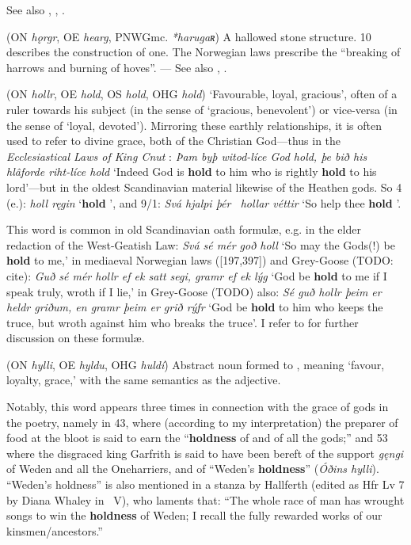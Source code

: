 \begin{itemize}
  See also , , .

 (ON \emph{hǫrgr}, OE \emph{hearg}, PNWGmc. \emph{*harugaʀ})
  A hallowed stone structure.   10 describes the construction of one.  The Norwegian laws prescribe the “breaking of harrows and burning of hoves”.
  --- See also , .

 (ON \emph{hollr}, OE \emph{hold}, OS \emph{hold}, OHG \emph{hold})
  ‘Favourable, loyal, gracious’, often of a ruler towards his subject (in the sense of ‘gracious, benevolent’) or vice-versa (in the sense of ‘loyal, devoted’).  Mirroring these earthly relationships, it is often used to refer to divine grace, both of the Christian God---thus in the \emph{Ecclesiastical Laws of King Cnut} : \emph{Þam byþ witod-líce God hold, þe bið his hlâforde riht-líce hold} ‘Indeed God is \textbf{hold} to him who is rightly \textbf{hold} to his lord’---but in the oldest Scandinavian material likewise of the Heathen gods.
  So  4 (e.): \emph{holl ręgin} ‘\textbf{hold} ’, and  9/1: \emph{Svá hjalpi þér \hld\ hollar véttir} ‘So help thee \textbf{hold} ’. %

  This word is common in old Scandinavian oath formulæ, e.g. in the elder redaction of the West-Geatish Law: \emph{Svá sé mér goð holl} ‘So may the Gods(!) be \textbf{hold} to me,’ in mediaeval Norwegian laws ([197,397]) and Grey-Goose (TODO: cite): \emph{Guð sé mér hollr ef ek satt segi, gramr ef ek lýg} ‘God be \textbf{hold} to me if I speak truly, wroth if I lie,’ in Grey-Goose (TODO) also: \emph{Sé guð hollr þeim er heldr griðum, en gramr þeim er grið rýfr} ‘God be \textbf{hold} to him who keeps the truce, but wroth against him who breaks the truce’. I refer to \textcite{Läffler1895} for further discussion on these formulæ.

 (ON \emph{hylli}, OE \emph{hyldu}, OHG \emph{huldí})
  Abstract noun formed to , meaning ‘favour, loyalty, grace,’ with the same semantics as the adjective.

  Notably, this word appears three times in connection with the grace of gods in the poetry, namely in  43, where (according to my interpretation) the preparer of food at the bloot is said to earn the “\textbf{holdness} of  and of all the gods;” and  53 where the disgraced king Garfrith is said to have been bereft of the support \emph{gęngi} of Weden and all the Oneharriers, and of “Weden’s \textbf{holdness}” (\emph{Óðins hylli}).  “Weden’s holdness” is also mentioned in a stanza by Hallferth (edited as Hfr Lv 7 by Diana Whaley in \Skp\ V), who laments that: “The whole race of man has wrought songs to win the \textbf{holdness} of Weden; I recall the fully rewarded works of our kinsmen/ancestors.”


\end{itemize}
